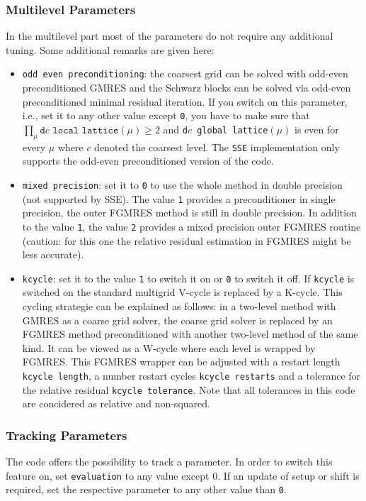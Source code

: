 \documentclass[a4paper,12pt]{scrartcl}
\begin{document}
\subsubsection{Multilevel Parameters}
In the multilevel part most of the parameters do not require any additional tuning. Some additional remarks are given here:
\begin{itemize}
  \item \texttt{odd even preconditioning}: the coarsest grid can be solved with odd-even preconditioned GMRES and the Schwarz blocks can be solved via odd-even preconditioned minimal residual iteration. If you switch on this parameter, i.e., set it to any other value except \texttt{0}, you have to make sure that $\prod_\mu\texttt{d$c$ local lattice}(\mu) \geq 2$ and \texttt{d$c$ global lattice}$(\mu)$ is even for every $\mu$ where $c$ denoted the coarsest level.
  The \texttt{SSE} implementation only supports the odd-even preconditioned version of the code.
  \item \texttt{mixed precision}: set it to \texttt{0} to use the whole method in double precision (not supported by SSE). The value \texttt{1} provides a preconditioner in single precision, the outer FGMRES method is still in double precision. In addition to the value \texttt{1}, the value \texttt{2} provides a mixed precision outer FGMRES routine (caution: for this one the relative residual estimation in FGMRES might be less accurate).
  \item \texttt{kcycle}: set it to the value \texttt{1} to switch it on or \texttt{0} to switch it off. If \texttt{kcycle} is switched on the standard multigrid V-cycle is replaced by a K-cycle. This cycling strategie can be explained as follows: in a two-level method with GMRES as a coarse grid solver, the coarse grid solver is replaced by an FGMRES method preconditioned with another two-level method of the same kind. It can be viewed as a W-cycle where each level is wrapped by FGMRES. This FGMRES wrapper can be adjusted with a restart length \texttt{kcycle length}, a number restart cycles \texttt{kcycle restarts} and a tolerance for the relative residual \texttt{kcycle tolerance}. Note that all tolerances in this code are concidered as relative and non-squared.
\end{itemize}

\subsubsection{Tracking Parameters}
The code offers the possibility to track a parameter. In order to switch this feature on, set \texttt{evaluation} to any value except 0. If an update of setup or shift is required, set the respective parameter to any other value than \texttt{0}.
\end{document}
